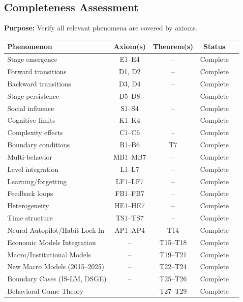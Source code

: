 \subsection{Completeness Assessment}

\begin{tcolorbox}[colback=green!5!white, colframe=green!75!black,
    title=Validation V8: Axiom Coverage Matrix]
\textbf{Purpose:} Verify all relevant phenomena are covered by axioms.

\begin{center}
\begin{tabular}{lcccc}
\toprule
\textbf{Phenomenon} & \textbf{Axiom(s)} & \textbf{Theorem(s)} & \textbf{Status} \\
\midrule
Stage emergence & E1--E4 & -- & Complete \\
Forward transitions & D1, D2 & -- & Complete \\
Backward transitions & D3, D4 & -- & Complete \\
Stage persistence & D5--D8 & -- & Complete \\
Social influence & S1--S4 & -- & Complete \\
Cognitive limits & K1--K4 & -- & Complete \\
Complexity effects & C1--C6 & -- & Complete \\
Boundary conditions & B1--B6 & T7 & Complete \\
Multi-behavior & MB1--MB7 & -- & Complete \\
Level integration & L1--L7 & -- & Complete \\
Learning/forgetting & LF1--LF7 & -- & Complete \\
Feedback loops & FB1--FB7 & -- & Complete \\
Heterogeneity & HE1--HE7 & -- & Complete \\
Time structure & TS1--TS7 & -- & Complete \\
\rowcolor{yellow!20}
Neural Autopilot/Habit Lock-In & AP1--AP4 & T14 & Complete \\
\rowcolor{green!20}
Economic Models Integration & -- & T15--T18 & Complete \\
\rowcolor{blue!20}
Macro/Institutional Models & -- & T19--T21 & Complete \\
\rowcolor{purple!20}
New Macro Models (2015--2025) & -- & T22--T24 & Complete \\
\rowcolor{gray!20}
Boundary Cases (IS-LM, DSGE) & -- & T25--T26 & Complete \\
\rowcolor{orange!20}
Behavioral Game Theory & -- & T27--T29 & Complete \\

\end{tabular}
\end{center}
\end{tcolorbox}
